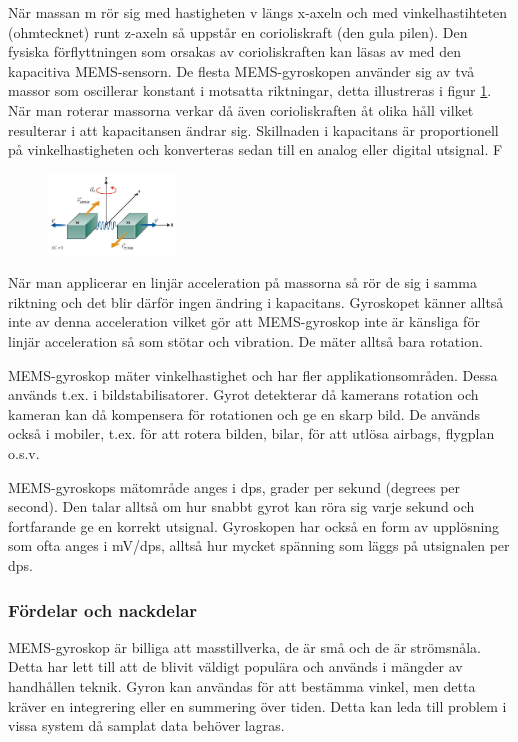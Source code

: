 \documentclass[a4paper,12pt,fleqn]{article}
\begin{document}
När massan m rör sig med hastigheten v längs x-axeln och med vinkelhastihteten (ohmtecknet) runt z-axeln så uppstår en corioliskraft (den gula pilen). Den fysiska förflyttningen som orsakas av corioliskraften kan läsas av med den kapacitiva MEMS-sensorn. De flesta MEMS-gyroskopen använder sig av två massor som oscillerar konstant i motsatta riktningar, detta illustreras i figur \ref{fig:angular}. När man roterar massorna verkar då även corioliskraften åt olika håll vilket resulterar i att kapacitansen ändrar sig. Skillnaden i kapacitans är proportionell på vinkelhastigheten och konverteras sedan till en analog eller digital utsignal. F

\begin{figure}[h]
\label{fig:angular}
\caption{}
\includegraphics[width=0.3\textwidth]
{angularv.png}
\end{figure}

När man applicerar en linjär acceleration på massorna så rör de sig i samma riktning och det blir därför ingen ändring i kapacitans. Gyroskopet känner alltså inte av denna acceleration vilket gör att MEMS-gyroskop inte är känsliga för linjär acceleration så som stötar och vibration. De mäter alltså bara rotation.

MEMS-gyroskop mäter vinkelhastighet och har fler applikationsområden. Dessa används t.ex. i bildstabilisatorer. Gyrot detekterar då kamerans rotation och kameran kan då kompensera för rotationen och ge en skarp bild. De används också i mobiler, t.ex. för att rotera bilden, bilar, för att utlösa airbags, flygplan o.s.v.

MEMS-gyroskops mätområde anges i dps, grader per sekund (degrees per second). Den talar alltså om hur snabbt gyrot kan röra sig varje sekund och fortfarande ge en korrekt utsignal. Gyroskopen har också en form av upplösning som ofta anges i mV/dps, alltså hur mycket spänning som läggs på utsignalen per dps. 

\subsubsection{Fördelar och nackdelar}
MEMS-gyroskop är billiga att masstillverka, de är små och de är strömsnåla. Detta har lett till att de blivit väldigt populära och används i mängder av handhållen teknik.
Gyron kan användas för att bestämma vinkel, men detta kräver en integrering eller en summering över tiden. Detta kan leda till problem i vissa system då samplat data behöver lagras.
\end{document}
